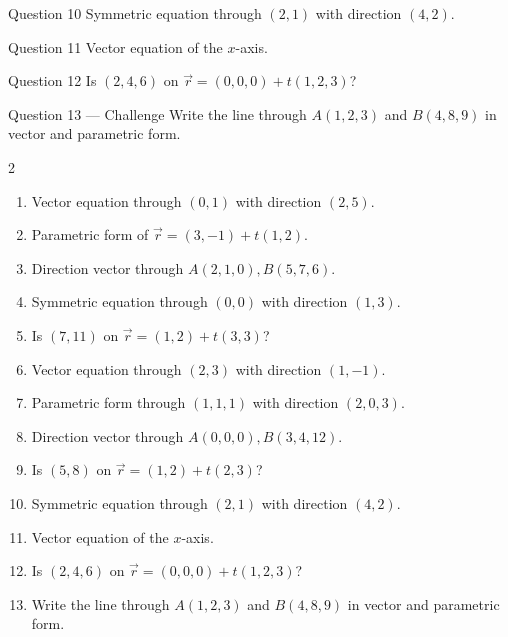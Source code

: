 \documentclass[11pt]{article}
\begin{document}
\begin{qbox}{Question 10}
Symmetric equation through $(2,1)$ with direction $(4,2)$.\workspace{2.4cm}
\end{qbox}

\begin{qbox}{Question 11}
Vector equation of the $x$-axis.\workspace{2.4cm}
\end{qbox}

\begin{qbox}{Question 12}
Is $(2,4,6)$ on $\vec r=(0,0,0)+t(1,2,3)$?\workspace{2.4cm}
\end{qbox}

\begin{qbox}{Question 13 --- Challenge}
Write the line through $A(1,2,3)$ and $B(4,8,9)$ in vector and parametric form.\workspace{3.5cm}
\end{qbox}

\clearpage
{}

\begin{recapbox}
\begin{multicols}{2}
\small
\begin{enumerate}[leftmargin=*,itemsep=3pt]
  \item Vector equation through $(0,1)$ with direction $(2,5)$.
  \item Parametric form of $\vec r=(3,-1)+t(1,2)$.
  \item Direction vector through $A(2,1,0),B(5,7,6)$.
  \item Symmetric equation through $(0,0)$ with direction $(1,3)$.
  \item Is $(7,11)$ on $\vec r=(1,2)+t(3,3)$?
  \item Vector equation through $(2,3)$ with direction $(1,-1)$.
  \item Parametric form through $(1,1,1)$ with direction $(2,0,3)$.
  \item Direction vector through $A(0,0,0),B(3,4,12)$.
  \item Is $(5,8)$ on $\vec r=(1,2)+t(2,3)$?
  \item Symmetric equation through $(2,1)$ with direction $(4,2)$.
  \item Vector equation of the $x$-axis.
  \item Is $(2,4,6)$ on $\vec r=(0,0,0)+t(1,2,3)$?
  \item Write the line through $A(1,2,3)$ and $B(4,8,9)$ in vector and parametric form.
\end{enumerate}
\end{multicols}
\end{recapbox}
\end{document}
